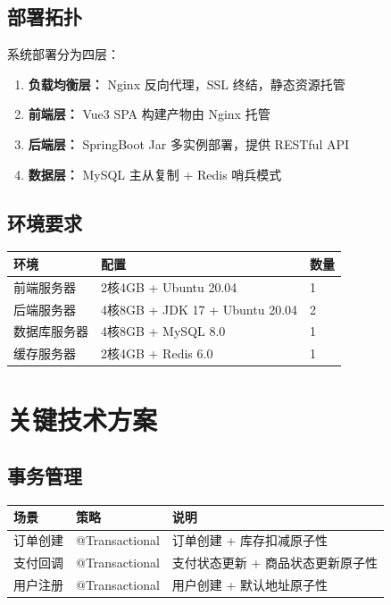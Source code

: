 \documentclass[12pt,a4paper,UTF8]{ctexart}
\begin{document}
\subsection{部署拓扑}

系统部署分为四层：

\begin{enumerate}[itemsep=5pt]
    \item \textbf{负载均衡层：} Nginx 反向代理，SSL 终结，静态资源托管
    \item \textbf{前端层：} Vue3 SPA 构建产物由 Nginx 托管
    \item \textbf{后端层：} SpringBoot Jar 多实例部署，提供 RESTful API
    \item \textbf{数据层：} MySQL 主从复制 + Redis 哨兵模式
\end{enumerate}

\subsection{环境要求}

\begin{longtable}{p{}|p{}|p{}}
    \toprule
    \textbf{环境} & \textbf{配置} & \textbf{数量} \\
    \midrule
    \endhead
    \bottomrule
    \endfoot

    前端服务器 & 2核4GB + Ubuntu 20.04 & 1 \\
    后端服务器 & 4核8GB + JDK 17 + Ubuntu 20.04 & 2 \\
    数据库服务器 & 4核8GB + MySQL 8.0 & 1 \\
    缓存服务器 & 2核4GB + Redis 6.0 & 1 \\
\end{longtable}

\section{关键技术方案}

\subsection{事务管理}

\begin{longtable}{p{}|p{}|p{}}
    \toprule
    \textbf{场景} & \textbf{策略} & \textbf{说明} \\
    \midrule
    \endhead
    \bottomrule
    \endfoot

    订单创建 & @Transactional & 订单创建 + 库存扣减原子性 \\
    支付回调 & @Transactional & 支付状态更新 + 商品状态更新原子性 \\
    用户注册 & @Transactional & 用户创建 + 默认地址原子性 \\
\end{longtable}
\end{document}
